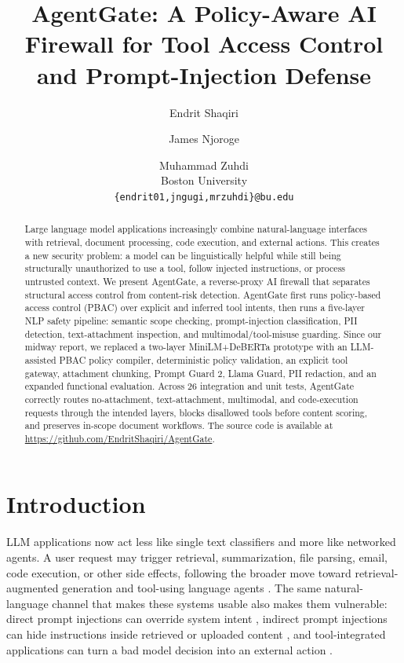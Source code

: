 \documentclass[11pt]{article}
\title{AgentGate: A Policy-Aware AI Firewall for Tool Access Control and Prompt-Injection Defense}
\author{
Endrit Shaqiri \and James Njoroge \and Muhammad Zuhdi \\
Boston University \\
\texttt{\{endrit01,jngugi,mrzuhdi\}@bu.edu}
}
\begin{document}
\maketitle

\begin{abstract}
Large language model applications increasingly combine natural-language interfaces with retrieval, document processing, code execution, and external actions. This creates a new security problem: a model can be linguistically helpful while still being structurally unauthorized to use a tool, follow injected instructions, or process untrusted context. We present AgentGate, a reverse-proxy AI firewall that separates structural access control from content-risk detection. AgentGate first runs policy-based access control (PBAC) over explicit and inferred tool intents, then runs a five-layer NLP safety pipeline: semantic scope checking, prompt-injection classification, PII detection, text-attachment inspection, and multimodal/tool-misuse guarding. Since our midway report, we replaced a two-layer MiniLM+DeBERTa prototype with an LLM-assisted PBAC policy compiler, deterministic policy validation, an explicit tool gateway, attachment chunking, Prompt Guard 2, Llama Guard, PII redaction, and an expanded functional evaluation. Across 26 integration and unit tests, AgentGate correctly routes no-attachment, text-attachment, multimodal, and code-execution requests through the intended layers, blocks disallowed tools before content scoring, and preserves in-scope document workflows. The source code is available at \url{https://github.com/EndritShaqiri/AgentGate}.
\end{abstract}

\section{Introduction}

LLM applications now act less like single text classifiers and more like networked agents. A user request may trigger retrieval, summarization, file parsing, email, code execution, or other side effects, following the broader move toward retrieval-augmented generation and tool-using language agents \citep{lewis2020retrieval,yao2023react,schick2023toolformer,qin2023toolllm}. The same natural-language channel that makes these systems usable also makes them vulnerable: direct prompt injections can override system intent \citep{perez2022ignore,schulhoff2023hackaprompt,toyer2023tensortrust}, indirect prompt injections can hide instructions inside retrieved or uploaded content \citep{greshake2023notwhat,yi2023bipia,hines2024spotlighting}, and tool-integrated applications can turn a bad model decision into an external action \citep{liu2023promptinjection}.
\end{document}
